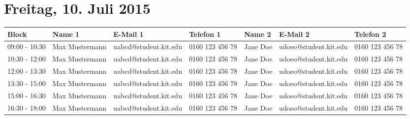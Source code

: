\documentclass[a4paper, landscape, 12pt]{scrartcl}
\begin{document}
    \section*{Freitag, 10. Juli 2015}
    \begin{table}[h]
        \begin{tabular}{l|lll|lll}
        \toprule
        \textbf{Block} & \textbf{Name 1}  & \textbf{E-Mail 1}  & \textbf{Telefon 1}     & \textbf{Name 2} & \textbf{E-Mail 2} & \textbf{Telefon 2}     \\
        \midrule
         09:00 - 10:30 & Max Mustermann      & uabcd@student.kit.edu                  & 0160 123 456 78 & Jane Doe        & udoeo@student.kit.edu                 & 0160 123 456 78  \\
        10:30 - 12:00  & Max Mustermann      & uabcd@student.kit.edu                  & 0160 123 456 78 & Jane Doe        & udoeo@student.kit.edu                 & 0160 123 456 78  \\
        12:00 - 13:30  & Max Mustermann      & uabcd@student.kit.edu                  & 0160 123 456 78 & Jane Doe        & udoeo@student.kit.edu                 & 0160 123 456 78  \\
        13:30 - 15:00  & Max Mustermann      & uabcd@student.kit.edu                  & 0160 123 456 78 & Jane Doe        & udoeo@student.kit.edu                 & 0160 123 456 78  \\
        15:00 - 16:30  & Max Mustermann      & uabcd@student.kit.edu                  & 0160 123 456 78 & Jane Doe        & udoeo@student.kit.edu                 & 0160 123 456 78  \\
        16:30 - 18:00  & Max Mustermann      & uabcd@student.kit.edu                  & 0160 123 456 78 & Jane Doe        & udoeo@student.kit.edu                 & 0160 123 456 78  \\
        \bottomrule
        \end{tabular}
\end{table}
\end{document}
